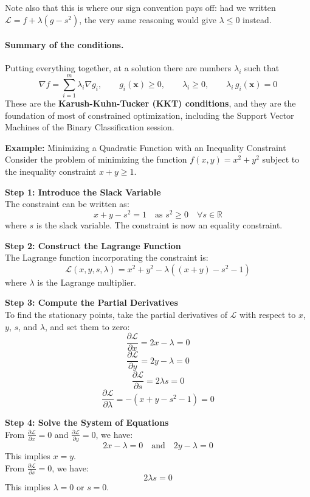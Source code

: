 \documentclass[]{article}
\begin{document}
	Note also that this is where our sign convention pays off: had we written $\mathcal{L} = f + \lambda(g - s^2)$, the very same reasoning would give $\lambda \leq 0$ instead.

	\paragraph{Summary of the conditions.}
	Putting everything together, at a solution there are numbers $\lambda_i$ such that
	$$
	\nabla f = \sum_{i=1}^m \lambda_i \nabla g_i,
	\qquad
	g_i(\mathbf{x}) \geq 0,
	\qquad
	\lambda_i \geq 0,
	\qquad
	\lambda_i \, g_i(\mathbf{x}) = 0
	$$
	These are the \textbf{Karush-Kuhn-Tucker (KKT) conditions}, and they are the foundation of most of constrained optimization, including the Support Vector Machines of the Binary Classification session.

	\vspace{1cm}
	\textbf{Example:}
	Minimizing a Quadratic Function with an Inequality Constraint\\
	Consider the problem of minimizing the function $f(x, y) = x^2 + y^2$ subject to the inequality constraint $x + y \geq 1$.
	
	\textbf{Step 1: Introduce the Slack Variable}\\
	The constraint can be written as:
	$$
	x + y - s^2 = 1 \quad \text{as } s^2 \geq 0 \quad \forall s \in \mathbb{R}
	$$
	where $s$ is the slack variable.
	The constraint is now an equality constraint.
	
	\textbf{Step 2: Construct the Lagrange Function}\\
	The Lagrange function incorporating the constraint is:
	$$
	\mathcal{L}(x, y, s, \lambda) = x^2 + y^2 - \lambda \left( (x + y) - s^2 - 1 \right)
	$$
	where $\lambda$ is the Lagrange multiplier.
	
	\textbf{Step 3: Compute the Partial Derivatives}\\
	To find the stationary points, take the partial derivatives of $\mathcal{L}$ with respect to $x$, $y$, $s$, and $\lambda$, and set them to zero:
	$$
	\frac{\partial \mathcal{L}}{\partial x} = 2x - \lambda = 0
	$$
	$$
	\frac{\partial \mathcal{L}}{\partial y} = 2y - \lambda = 0
	$$
	$$
	\frac{\partial \mathcal{L}}{\partial s} = 2\lambda s = 0
	$$
	$$
	\frac{\partial \mathcal{L}}{\partial \lambda} = -\left( x + y - s^2 - 1 \right) = 0
	$$
	
	\textbf{Step 4: Solve the System of Equations}\\
	From $\frac{\partial \mathcal{L}}{\partial x} = 0$ and $\frac{\partial \mathcal{L}}{\partial y} = 0$, we have:
	$$
	2x - \lambda = 0 \quad \text{and} \quad 2y - \lambda = 0
	$$
	This implies $x = y$.\\
	From $\frac{\partial \mathcal{L}}{\partial s} = 0$, we have:
	$$
	2\lambda s = 0
	$$
	This implies $\lambda = 0$ or $s = 0$. 
	
\end{document}
